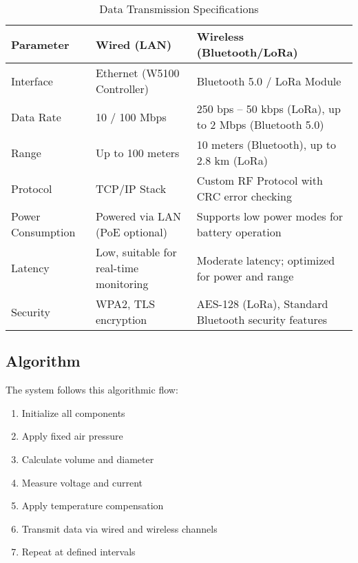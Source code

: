 \documentclass[12pt]{report}
\begin{document}
\usepackage{tabularx} %

\begin{table}[H]
\centering
\caption{Data Transmission Specifications}
\label{tab:transmission_specs}
\renewcommand{\arraystretch}{1.3} %

\begin{tabularx}{\textwidth}{|l|X|X|}
\hline
\textbf{Parameter} & \textbf{Wired (LAN)} & \textbf{Wireless (Bluetooth/LoRa)} \\ \hline
Interface & Ethernet (W5100 Controller) & Bluetooth 5.0 / LoRa Module \\ \hline
Data Rate & 10 / 100 Mbps & 250 bps – 50 kbps (LoRa), up to 2 Mbps (Bluetooth 5.0) \\ \hline
Range & Up to 100 meters & 10 meters (Bluetooth), up to 2.8 km (LoRa) \\ \hline
Protocol & TCP/IP Stack & Custom RF Protocol with CRC error checking \\ \hline
Power Consumption & Powered via LAN (PoE optional) & Supports low power modes for battery operation \\ \hline
Latency & Low, suitable for real-time monitoring & Moderate latency; optimized for power and range \\ \hline
Security & WPA2, TLS encryption & AES-128 (LoRa), Standard Bluetooth security features \\ \hline
\end{tabularx}
\end{table}


\subsection{Algorithm}
The system follows this algorithmic flow:

\begin{enumerate}[leftmargin=*]
    \item Initialize all components
    \item Apply fixed air pressure
    \item Calculate volume and diameter
    \item Measure voltage and current
    \item Apply temperature compensation
    \item Transmit data via wired and wireless channels
    \item Repeat at defined intervals
\end{enumerate}
\end{document}
